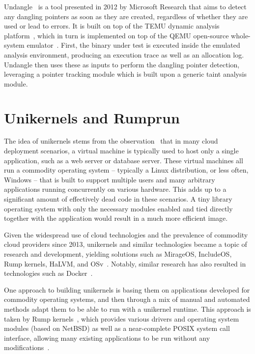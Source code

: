 Undangle~\cite{undangle2012} is a tool presented in 2012 by Microsoft Research that aims to detect any dangling pointers as soon as they are created, regardless of whether they are used or lead to errors. It is built on top of the TEMU dynamic analysis platform~\cite{bitblaze-temu2008}, which in turn is implemented on top of the QEMU open-source whole-system emulator~\cite{qemu-web}. First, the binary under test is executed inside the emulated analysis environment, producing an execution trace as well as an allocation log. Undangle then uses these as inputs to perform the dangling pointer detection, leveraging a pointer tracking module which is built upon a generic taint analysis module.



\section{Unikernels and Rumprun}

The idea of unikernels stems from the observation~\cite{unikernels-intro} that in many cloud deployment scenarios, a virtual machine is typically used to host only a single application, such as a web server or database server. These virtual machines all run a commodity operating system -- typically a Linux distribution, or less often, Windows -- that is built to support multiple users and many arbitrary applications running concurrently on various hardware. This adds up to a significant amount of effectively dead code in these scenarios.
A tiny library operating system with only the necessary modules enabled and tied directly together with the application would result in a much more efficient image.

Given the widespread use of cloud technologies and the prevalence of commodity cloud providers since 2013, unikernels and similar technologies became a topic of research and development, yielding solutions such as MirageOS, IncludeOS, Rump kernels, HaLVM, and OSv~\cite{unikernels-list}. Notably, similar research has also resulted in technologies such as Docker~\cite{docker-web}.

One approach to building unikernels is basing them on applications developed for commodity operating systems, and then through a mix of manual and automated methods adapt them to be able to run with a unikernel runtime. This approach is taken by Rump kernels~\cite{rumpkernels-web}, which provides various drivers and operating system modules (based on NetBSD) as well as a near-complete POSIX system call interface, allowing many existing applications to be run without any modifications~\cite{rumpkernels-doc}.

